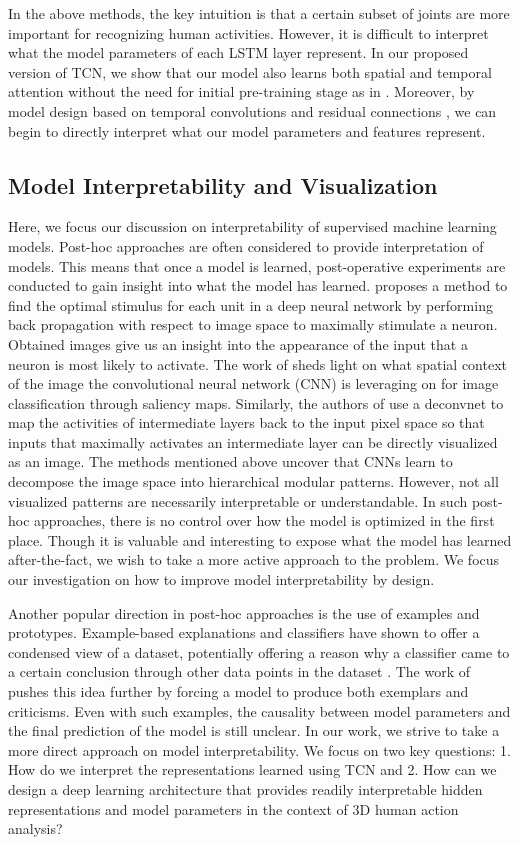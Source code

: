 \documentclass[10pt,twocolumn,letterpaper]{article}
\begin{document}
In the above methods, the key intuition is that a certain subset of joints are more important for recognizing human activities. However, it is difficult to interpret what the model parameters of each LSTM layer represent. In our proposed version of  TCN, we show that our model also learns both spatial and temporal attention without the need for initial pre-training stage as in \cite{Song2017}. Moreover, by model design based on temporal convolutions \cite{TCN} and residual connections \cite{resnet}, we can begin to directly interpret what our model parameters and features represent. 

\subsection{Model Interpretability and Visualization}
Here, we focus our discussion on interpretability of supervised machine learning models. Post-hoc approaches are often considered to provide interpretation of models. This means that once a model is learned, post-operative experiments are conducted to gain insight into what the model has learned. \cite{high-layer} proposes a method to find the optimal stimulus for each unit in a deep neural network by performing back propagation with respect to image space to maximally stimulate a neuron. Obtained images give us an insight into the appearance of the input that a neuron is most likely to activate. The work of \cite{Simonyan2013} sheds light on what spatial context of the image the convolutional neural network (CNN) is leveraging on for image classification through saliency maps. Similarly, the authors of \cite{Zeiler2014} use a deconvnet \cite{deconv} to map the activities of intermediate layers back to the input pixel space so that inputs that maximally activates an intermediate layer can be directly visualized as an image. The methods mentioned above uncover that CNNs learn to decompose the image space into hierarchical modular patterns. However, not all visualized patterns are necessarily interpretable or understandable. In such post-hoc approaches, there is no control over how the model is optimized in the first place. Though it is valuable and interesting to expose what the model has learned after-the-fact, we wish to take a more active approach to the problem. We focus our investigation on how to improve model interpretability by design. 

Another popular direction in post-hoc approaches is the use of examples and prototypes. Example-based explanations and classifiers have shown to offer a condensed view of a dataset, potentially offering a reason why a classifier came to a certain conclusion through other data points in the dataset \cite{prototype}. The work of \cite{critic} pushes this idea further by forcing a model to produce both exemplars and criticisms. Even with such examples, the causality between model parameters and the final prediction of the model is still unclear. In our work, we strive to take a more direct approach on model interpretability. We focus on two key questions: 1. How do we interpret the representations learned using TCN and 2. How can we design a deep learning architecture that provides readily interpretable hidden representations and model parameters in the context of 3D human action analysis?
\end{document}
